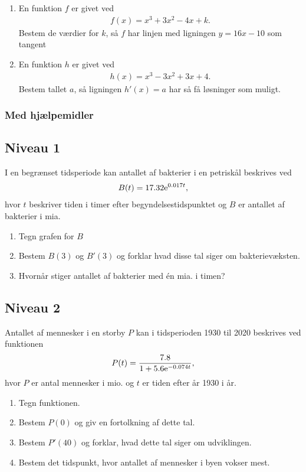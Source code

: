 \begin{enumerate}[label=\roman*)]
	\item En funktion $f$ er givet ved
	\begin{align*}
		f(x) = x^3 + 3x^2 - 4x + k.
	\end{align*}
	Bestem de værdier for $k$, så $f$ har linjen med ligningen $y = 16x-10$ som tangent
	\item En funktion $h$ er givet ved
	\begin{align*}
		h(x) = x^3-3x^2+3x+4.
	\end{align*}
	Bestem tallet $a$, så ligningen $h'(x) = a$ har så få løsninger som muligt.
\end{enumerate}

\subsubsection*{Med hjælpemidler}

\subsection*{Niveau 1}
I en begrænset tidsperiode kan antallet af bakterier i en petriskål beskrives ved
\begin{align*}
	B(t) = 17.32\textnormal{e}^{0.017t},
\end{align*}
hvor $t$ beskriver tiden i timer efter begyndelsestidspunktet og $B$ er antallet af bakterier i mia. 

\begin{enumerate}[label=\roman*)]
	\item Tegn grafen for $B$
	\item Bestem $B(3)$ og $B'(3)$ og forklar hvad disse tal siger om bakterievæksten.
	\item Hvornår stiger antallet af bakterier med én mia. i timen?
\end{enumerate}

\subsection*{Niveau 2}

Antallet af mennesker i en storby $P$ kan i tidsperioden 1930 til 2020 beskrives ved funktionen
\begin{align*}
	P(t) = \frac{7.8}{1+5.6\textnormal{e}^{-0.074t}},
\end{align*}
hvor $P$ er antal mennesker i mio. og $t$ er tiden efter år 1930 i år. 
\begin{enumerate}[label=\roman*)]
	\item Tegn funktionen.
	\item Bestem $P(0)$ og giv en fortolkning af dette tal.
	\item Bestem $P'(40)$ og forklar, hvad dette tal siger om udviklingen. 
	\item Bestem det tidspunkt, hvor antallet af mennesker i byen vokser mest. 
\end{enumerate}


